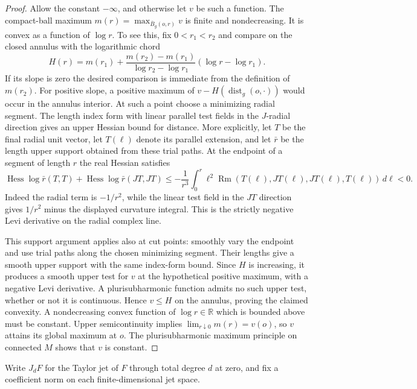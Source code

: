 \documentclass[11pt]{article}
\theoremstyle{definition}
\theoremstyle{remark}
\newcommand{\R}{\mathbb R}
\DeclareMathOperator{\Rm}{Rm}
\DeclareMathOperator{\dist}{dist}
\numberwithin{equation}{section}
\begin{document}
\begin{proof}
Allow the constant $-\infty$, and otherwise let $v$ be such a
function.  The compact-ball maximum
$m(r)=\max_{\overline B_g(o,r)}v$ is finite and nondecreasing.
It is convex as a function of $\log r$.  To see this, fix
$0<r_1<r_2$ and compare on the closed annulus with the
logarithmic chord
\[
 H(r)=m(r_1)
  +\frac{m(r_2)-m(r_1)}{\log r_2-\log r_1}
      (\log r-\log r_1).
\]
If its slope is zero the desired comparison is immediate from
the definition of $m(r_2)$.  For positive slope, a positive
maximum of $v-H(\dist_g(o,\cdot))$ would occur in the annulus
interior.  At such a point choose a minimizing radial segment.
The length index form with linear parallel test fields in the
$J$-radial direction gives an upper Hessian bound for distance.
More explicitly, let $T$ be the final radial unit vector, let
$T(\ell)$ denote its parallel extension, and let $\bar r$ be
the length upper support obtained from these trial paths.  At
the endpoint of a segment of length $r$ the real Hessian satisfies
\[
 \operatorname{Hess}\log\bar r(T,T)
 +\operatorname{Hess}\log\bar r(JT,JT)
 \le-\frac1{r^3}\int_0^r
       \ell^2\Rm(T(\ell),JT(\ell),JT(\ell),T(\ell))\,d\ell<0.
\]
Indeed the radial term is $-1/r^2$, while the linear test field
in the $JT$ direction gives $1/r^2$ minus the displayed
curvature integral.  This is the strictly negative Levi
derivative on the radial complex line.

This support argument applies also at cut points: smoothly vary
the endpoint and use trial paths along the chosen minimizing
segment.  Their lengths give a smooth upper support with the
same index-form bound.  Since $H$ is increasing, it produces
a smooth upper test for $v$ at the hypothetical positive
maximum, with a negative Levi derivative.  A plurisubharmonic
function admits no such upper test, whether or not it is
continuous.  Hence $v\le H$ on the annulus, proving the
claimed convexity.  A nondecreasing convex function of
$\log r\in\R$ which is bounded above must be constant.
Upper semicontinuity implies
$\lim_{r\downarrow0}m(r)=v(o)$, so $v$ attains its global
maximum at $o$.  The plurisubharmonic maximum principle on
connected $M$ shows that $v$ is constant.
\end{proof}

Write $J_dF$ for the Taylor jet of $F$ through total degree $d$ at zero,
and fix a coefficient norm on each finite-dimensional jet space.
\end{document}
